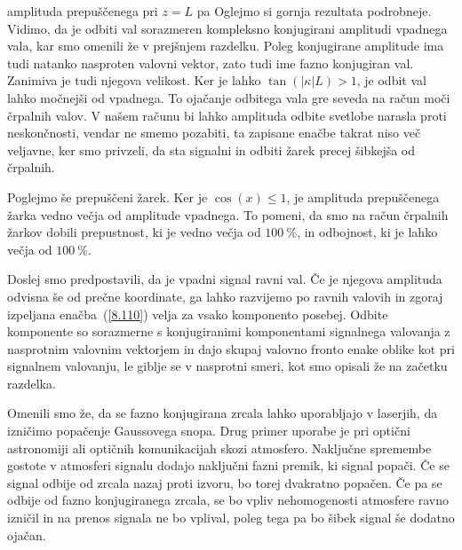 amplituda prepuščenega pri $z = L$ pa
Oglejmo si gornja rezultata podrobneje. Vidimo, da je odbiti val sorazmeren 
kompleksno konjugirani amplitudi vpadnega vala, kar smo omenili že v prejšnjem
razdelku. Poleg konjugirane amplitude ima tudi natanko nasproten valovni vektor, 
zato tudi ime fazno konjugiran val. Zanimiva je tudi njegova velikost. Ker 
je lahko $\tan\left(|\kappa|L\right)>1$, je odbit val lahko močnejši od vpadnega.
To ojačanje odbitega vala gre seveda na račun moči črpalnih
valov. V našem računu bi lahko amplituda odbite svetlobe narasla proti neskončnosti, 
vendar ne smemo pozabiti, ta zapisane enačbe takrat niso več veljavne, ker smo privzeli, 
da sta signalni in odbiti žarek precej šibkejša od črpalnih.

Poglejmo še prepuščeni žarek. Ker je $\cos(x)\leq1$, je amplituda prepuščenega
žarka vedno večja od amplitude vpadnega. To pomeni, da smo na račun črpalnih žarkov
dobili prepustnost, ki je vedno večja od $100~\%$, in odbojnost, ki je lahko 
večja od $100~\%$.

Doslej smo predpostavili, da je vpadni signal ravni val. Če je njegova
amplituda odvisna še od prečne koordinate, ga lahko razvijemo po ravnih
valovih in zgoraj izpeljana enačba~(\ref{8.110}) velja za vsako komponento posebej. 
Odbite komponente so sorazmerne s konjugiranimi komponentami signalnega valovanja
z nasprotnim valovnim vektorjem in dajo skupaj valovno fronto enake
oblike kot pri signalnem valovanju, le giblje se v nasprotni smeri, kot
smo opisali že na začetku razdelka.

\begin{remark}
Omenili smo že, da se fazno konjugirana zrcala lahko uporabljajo v laserjih, da
izničimo popačenje Gaussovega snopa. Drug primer uporabe je pri optični astronomiji
ali optičnih komunikacijah skozi atmosfero. Naključne spremembe gostote v atmosferi
signalu dodajo naključni fazni premik, ki signal popači. Če se signal odbije od zrcala nazaj
proti izvoru, bo torej dvakratno popačen. Če pa se odbije od fazno konjugiranega zrcala, 
se bo vpliv nehomogenosti atmosfere ravno izničil in na prenos signala ne bo vplival, poleg
tega pa bo šibek signal še dodatno ojačan. 
\end{remark}